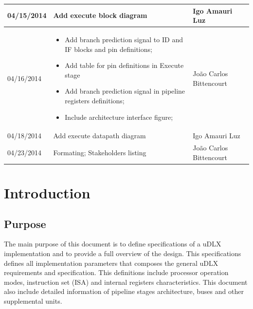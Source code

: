 \documentclass{article}
\begin{document}
\begin{table}[ht]
\begin{tabular}[pos]{|m{2cm} | m{7.2cm} | m{3.8cm}|}
  \small 04/15/2014 & \small Add execute block diagram & \small Igo Amauri Luz \\ \hline
  \small 04/16/2014 & \small   \begin{small}
    \begin{itemize}
      \item Add branch prediction signal to ID and IF blocks and pin definitions;
      \item Add table for pin definitions in Execute stage
      \item Add branch prediction signal in pipeline registers definitions;
      \item Include architecture interface figure;
    \end{itemize}
  \end{small} & \small João Carlos Bittencourt \\ \hline 
  \small 04/18/2014 & \small Add execute datapath diagram & \small Igo Amauri Luz \\ \hline
  \small 04/23/2014 & \small Formating; Stakeholders listing & \small João Carlos Bittencourt \\ \hline  
  \end{tabular}
  \end{table}

  \newpage
  
  \tableofcontents
  \newpage

  \section{Introduction}
  \subsection{Purpose}
  The main purpose of this document is to define specifications of a uDLX implementation and to provide a full overview of the design. This specifications defines all implementation parameters that composes the general uDLX requirements and specification. This definitions include processor operation modes, instruction set (ISA) and internal registers characteristics. This document also include detailed information of pipeline stages architecture, buses and other supplemental units.
\end{document}
